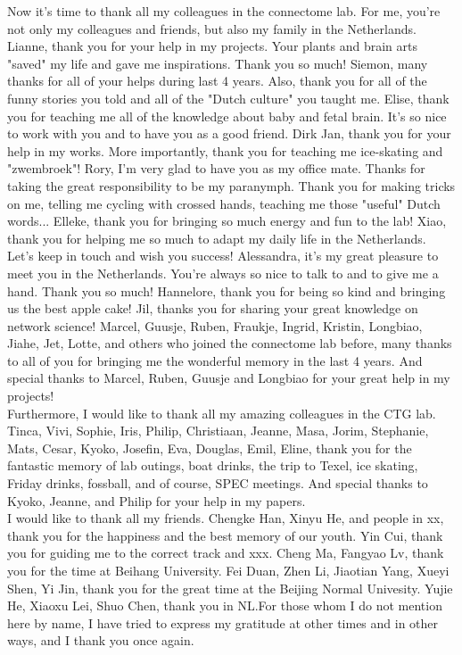 \noindent
Now it's time to thank all my colleagues in the connectome lab. For me, you're not only my colleagues and friends, but also my family in the Netherlands. Lianne, thank you for your help in my projects. Your plants and brain arts "saved" my life and gave me inspirations. Thank you so much! Siemon, many thanks for all of your helps during last 4 years. Also, thank you for all of the funny stories you told and all of the "Dutch culture" you taught me. Elise, thank you for teaching me all of the knowledge about baby and fetal brain. It's so nice to work with you and to have you as a good friend. Dirk Jan, thank you for your help in my works. More importantly, thank you for teaching me ice-skating and "zwembroek"! Rory, I'm very glad to have you as my office mate. Thanks for taking the great responsibility to be my paranymph. Thank you for making tricks on me, telling me cycling with crossed hands, teaching me those "useful" Dutch words... Elleke, thank you for bringing so much energy and fun to the lab! Xiao, thank you for helping me so much to adapt my daily life in the Netherlands. Let's keep in touch and wish you success! Alessandra, it's my great pleasure to meet you in the Netherlands. You're always so nice to talk to and to give me a hand. Thank you so much! Hannelore, thank you for being so kind and bringing us the best apple cake! Jil, thanks you for sharing your great knowledge on network science! Marcel, Guusje, Ruben, Fraukje, Ingrid, Kristin, Longbiao, Jiahe, Jet, Lotte, and others who joined the connectome lab before, many thanks to all of you for bringing me the wonderful memory in the last 4 years. And special thanks to Marcel, Ruben, Guusje and Longbiao for your great help in my projects!\\

\noindent
Furthermore, I would like to thank all my amazing colleagues in the CTG lab. Tinca, Vivi, Sophie, Iris, Philip, Christiaan, Jeanne, Masa, Jorim, Stephanie, Mats, Cesar, Kyoko, Josefin, Eva, Douglas, Emil, Eline, thank you for the fantastic memory of lab outings, boat drinks, the trip to Texel, ice skating, Friday drinks, fossball, and of course, SPEC meetings. And special thanks to Kyoko, Jeanne, and Philip for your help in my papers.\\

\noindent
I would like to thank all my friends. Chengke Han, Xinyu He, and people in xx, thank you for the happiness and the best memory of our youth. Yin Cui, thank you for guiding me to the correct track and xxx. Cheng Ma, Fangyao Lv, thank you for the time at Beihang University. Fei Duan, Zhen Li, Jiaotian Yang, Xueyi Shen, Yi Jin, thank you for the great time at the Beijing Normal Univesity. Yujie He, Xiaoxu Lei, Shuo Chen, thank you in NL.For those whom I do not mention here by name, I have tried to express my gratitude at other times and in other ways, and I thank you once again.\\

